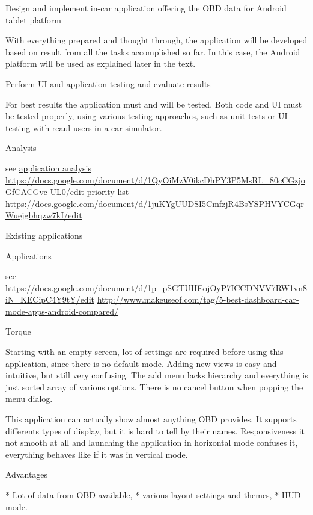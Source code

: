 \secc Design and implement in-car application offering the OBD data for Android tablet platform

With everything prepared and thought through, the application will be developed based on result from all the tasks accomplished so far. In this case, the Android platform will be used as explained later in the text.

\secc Perform UI and application testing and evaluate results

For best results the application must and will be tested. Both code and UI must be tested properly, using various testing approaches, such as unit tests or UI testing with reaul users in a car simulator.

\chap Analysis

see \url{application analysis https://docs.google.com/document/d/1QyOiMzV0ikcDhPY3P5MsRL_80cCGzjoGfCACGvc-UL0/edit}
priority list \url{https://docs.google.com/document/d/1juKYgUUDSI5CmfzjR4BsYSPHVYCGqrWuejgbhqzw7kI/edit}

\sec Existing applications


\secc Applications

see \url{https://docs.google.com/document/d/1p_pSGTUHEojOyP7ICCDNVV7RW1vn8iN_KECipC4Y9tY/edit}
\url{http://www.makeuseof.com/tag/5-best-dashboard-car-mode-apps-android-compared/}

\secc Torque

Starting with an empty screen, lot of settings are required before using this application, since there is no default mode. Adding new views is easy and intuitive, but still very confusing. The add menu lacks hierarchy and everything is just sorted array of various options. There is no cancel button when popping the menu dialog.

This application can actually show almost anything OBD provides. It supports differents types of display, but it is hard to tell by their names. Responsiveness it not smooth at all and launching the application in horizontal mode confuses it, everything behaves like if it was in vertical mode.

\seccc Advantages

\begitems
* Lot of data from OBD available,
* various layout settings and themes,
* HUD mode.
\enditems

